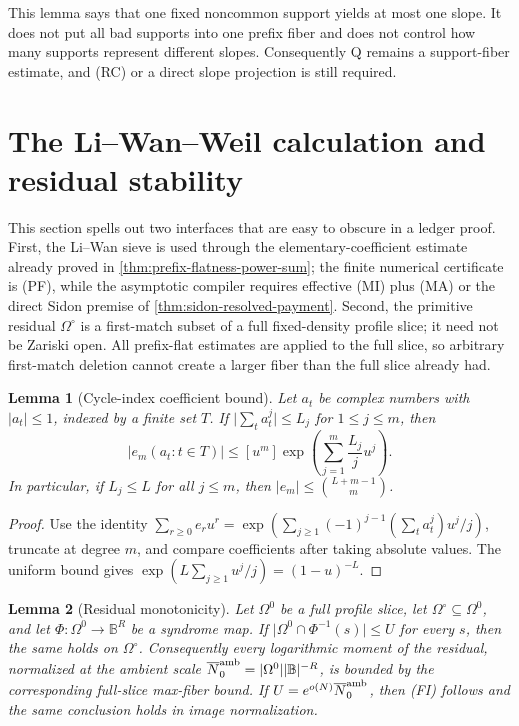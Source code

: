 \documentclass[12pt,a4paper]{amsart}
\numberwithin{equation}{section}
\newtheorem{lemma}[lemma]{Lemma}
\theoremstyle{remark}
\newcommand{\B}{\mathbb B}
\newcommand{\Omc}{\Omega^{\circ}}
\newcommand{\barN}{\overline N}
\newcommand{\abs}[1]{\lvert #1\rvert}
\begin{document}
This lemma says that one fixed noncommon support yields at most one slope.
It does not put all bad supports into one prefix fiber and does not control
how many supports represent different slopes.  Consequently Q remains a
support-fiber estimate, and \textup{(RC)} or a direct slope projection is
still required.

\section{The Li--Wan--Weil calculation and residual stability}\label{sec:li-wan-details}

This section spells out two interfaces that are easy to obscure in a
ledger proof.  First, the Li--Wan sieve is used through the
elementary-coefficient estimate already proved in
\cref{thm:prefix-flatness-power-sum}; the finite numerical certificate is
\textup{(PF)}, while the asymptotic compiler requires effective
\textup{(MI)} plus \textup{(MA)} or the direct Sidon premise of
\cref{thm:sidon-resolved-payment}.  Second, the primitive residual
\(\Omc\) is a first-match subset of a full fixed-density profile slice; it
need not be Zariski open.  All prefix-flat estimates are applied to the
full slice, so arbitrary first-match deletion cannot create a larger fiber
than the full slice already had.

\begin{lemma}[Cycle-index coefficient bound]\label{lem:cycle-index-bound}
Let \(a_t\) be complex numbers with \(\abs{a_t}\le1\), indexed by a finite set \(T\).  If \(\abs{\sum_t a_t^j}\le L_j\) for \(1\le j\le m\), then
\[
        \abs{e_m(a_t:t\in T)}
        \le [u^m]\exp\left(\sum_{j=1}^m\frac{L_j}{j}u^j\right).
\]
In particular, if \(L_j\le L\) for all \(j\le m\), then \(\abs{e_m}\le\binom{L+m-1}{m}\).
\end{lemma}

\begin{proof}
Use the identity \(\sum_{r\ge0}e_r u^r=\exp(\sum_{j\ge1}(-1)^{j-1}(\sum_ta_t^j)u^j/j)\), truncate at degree \(m\), and compare coefficients after taking absolute values.  The uniform bound gives \(\exp(L\sum_{j\ge1}u^j/j)=(1-u)^{-L}\).
\end{proof}

\begin{lemma}[Residual monotonicity]\label{lem:residual-monotonicity}
Let \(\Omega^0\) be a full profile slice, let \(\Omc\subseteq\Omega^0\),
and let \(\Phi:\Omega^0\to\B^R\) be a syndrome map.  If
\(\abs{\Omega^0\cap\Phi^{-1}(s)}\le U\) for every \(s\), then the same
holds on \(\Omc\).  Consequently every logarithmic moment of the residual,
normalized at the ambient scale
\(\barN_0^{\rm amb}=\abs{\Omega^0}\abs\B^{-R}\), is bounded by the
corresponding full-slice max-fiber bound.  If
\(U=e^{o(N)}\barN_0^{\rm amb}\), then \textup{(FI)} follows and the same
conclusion holds in image normalization.
\end{lemma}
\end{document}
